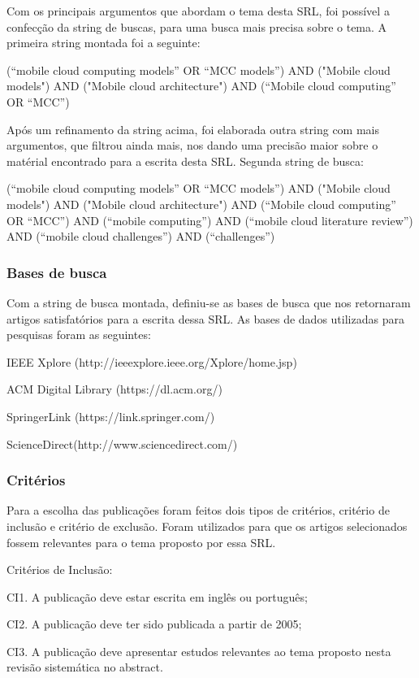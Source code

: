\documentclass[12pt]{article}
\begin{document}
Com os principais argumentos que abordam o tema desta SRL, foi possível a confecção da string de buscas, para uma busca mais precisa sobre o tema. A primeira string montada foi a seguinte:
 
(“mobile cloud computing models” OR “MCC models”) AND ("Mobile cloud models") AND ("Mobile cloud architecture") AND (“Mobile cloud computing” OR “MCC”)
 
Após um refinamento da string acima, foi elaborada outra string com mais argumentos, que filtrou ainda mais, nos dando uma precisão maior sobre o matérial encontrado para a escrita desta SRL. Segunda string de busca:
 
(“mobile cloud computing models” OR “MCC models”) AND ("Mobile cloud models") AND ("Mobile cloud architecture") AND (“Mobile cloud computing” OR “MCC”) AND (“mobile computing”) AND (“mobile cloud literature review”) AND (“mobile cloud challenges”) AND (“challenges”)

\subsubsection{Bases de busca}
Com a string de busca montada, definiu-se as bases de busca que nos retornaram artigos satisfatórios para a escrita dessa SRL. As bases de dados utilizadas para pesquisas foram as seguintes:

IEEE Xplore (http://ieeexplore.ieee.org/Xplore/home.jsp)

ACM Digital Library (https://dl.acm.org/)

SpringerLink (https://link.springer.com/)

ScienceDirect(http://www.sciencedirect.com/)

\subsubsection{Critérios}
Para a escolha das publicações foram feitos dois tipos de critérios,  critério de inclusão e critério de exclusão. Foram utilizados para que os artigos selecionados fossem relevantes para o tema proposto por essa SRL.

Critérios de Inclusão:

CI1. A publicação deve estar escrita em inglês ou português;

CI2. A publicação deve ter sido publicada a partir de 2005;

CI3. A publicação deve apresentar estudos relevantes ao tema proposto nesta revisão sistemática no abstract.
\end{document}
